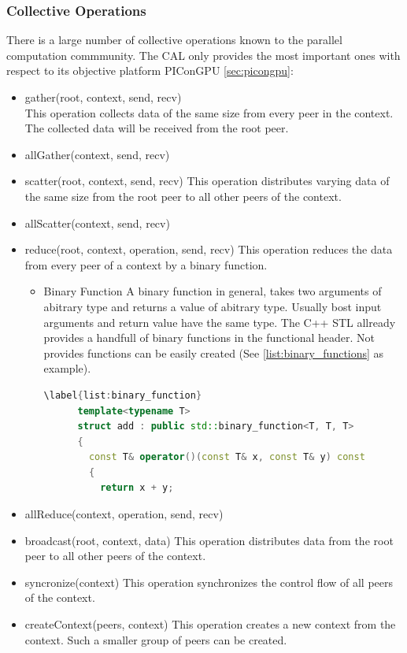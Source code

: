 \subsubsection{Collective Operations}
\label{sec:cal_collective}
There is a large number of collective operations known to the
parallel computation commmunity. The CAL only provides the most
important ones with respect to its objective platform PIConGPU \ref{sec:picongpu}:

\begin{itemize}
\item gather(root, context, send, recv)\\
  This operation collects data of the same size from
  every peer in the context. The collected data will be
  received from the root peer.
\item allGather(context, send, recv)
\item scatter(root, context, send, recv)
  This operation distributes varying data of the same size from the root peer to
  all other peers of the context.
\item allScatter(context, send, recv)

\item reduce(root, context, operation, send, recv)
  This operation reduces the data from every peer of a context by
  a binary function.

\begin{itemize}
  \item Binary Function
    A binary function in general, takes two arguments of abitrary type and
    returns a value of abitrary type. Usually bost input arguments and
    return value have the same type. The C++ STL allready provides
    a handfull of binary functions in the functional header. Not provides
    functions can be easily created (See \ref{list:binary_functions}
    as example).

    \begin{lstlisting}[language=C++, breaklines=false]
      \label{list:binary_function}
      template<typename T>
      struct add : public std::binary_function<T, T, T>
      {
        const T& operator()(const T& x, const T& y) const
        {
          return x + y;
    \end{lstlisting}
  \end{itemize}

\item allReduce(context, operation, send, recv)

\item broadcast(root, context, data)
  This operation distributes data from the root peer to
  all other peers of the context.
\item syncronize(context)
  This operation synchronizes the control flow of all peers of the context.
\item createContext(peers, context)
  This operation creates a new context from the context. Such a smaller
  group of peers can be created.
\end{itemize}

